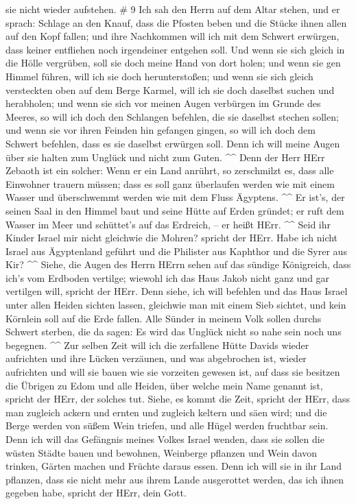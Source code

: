sie nicht wieder aufstehen. \# 9  Ich sah den Herrn auf dem
Altar stehen, und er sprach: Schlage an den Knauf, dass die Pfosten
beben und die Stücke ihnen allen auf den Kopf fallen; und ihre
Nachkommen will ich mit dem Schwert erwürgen, dass keiner entfliehen
noch irgendeiner entgehen soll.  Und wenn sie sich gleich in
die Hölle vergrüben, soll sie doch meine Hand von dort holen; und wenn
sie gen Himmel führen, will ich sie doch herunterstoßen; 
und wenn sie sich gleich versteckten oben auf dem Berge Karmel, will ich
sie doch daselbst suchen und herabholen; und wenn sie sich vor meinen
Augen verbürgen im Grunde des Meeres, so will ich doch den Schlangen
befehlen, die sie daselbst stechen sollen;  und wenn sie vor
ihren Feinden hin gefangen gingen, so will ich doch dem Schwert
befehlen, dass es sie daselbst erwürgen soll. Denn ich will meine Augen
über sie halten zum Unglück und nicht zum Guten. \^{}\^{} 
Denn der Herr HErr Zebaoth ist ein solcher: Wenn er ein Land anrührt, so
zerschmilzt es, dass alle Einwohner trauern müssen; dass es soll ganz
überlaufen werden wie mit einem Wasser und überschwemmt werden wie mit
dem Fluss Ägyptens. \^{}\^{}  Er ist's, der seinen Saal in
den Himmel baut und seine Hütte auf Erden gründet; er ruft dem Wasser im
Meer und schüttet's auf das Erdreich, -- er heißt HErr. \^{}\^{}
 Seid ihr Kinder Israel mir nicht gleichwie die Mohren?
spricht der HErr. Habe ich nicht Israel aus Ägyptenland geführt und die
Philister aus Kaphthor und die Syrer aus Kir? \^{}\^{} 
Siehe, die Augen des Herrn HErrn sehen auf das sündige Königreich, dass
ich's vom Erdboden vertilge; wiewohl ich das Haus Jakob nicht ganz und
gar vertilgen will, spricht der HErr.  Denn siehe, ich will
befehlen und das Haus Israel unter allen Heiden sichten lassen,
gleichwie man mit einem Sieb sichtet, und kein Körnlein soll auf die
Erde fallen.  Alle Sünder in meinem Volk sollen durchs
Schwert sterben, die da sagen: Es wird das Unglück nicht so nahe sein
noch uns begegnen. \^{}\^{}  Zur selben Zeit will ich die
zerfallene Hütte Davids wieder aufrichten und ihre Lücken verzäunen, und
was abgebrochen ist, wieder aufrichten und will sie bauen wie sie
vorzeiten gewesen ist,  auf dass sie besitzen die Übrigen
zu Edom und alle Heiden, über welche mein Name genannt ist, spricht der
HErr, der solches tut.  Siehe, es kommt die Zeit, spricht
der HErr, dass man zugleich ackern und ernten und zugleich keltern und
säen wird; und die Berge werden von süßem Wein triefen, und alle Hügel
werden fruchtbar sein.  Denn ich will das Gefängnis meines
Volkes Israel wenden, dass sie sollen die wüsten Städte bauen und
bewohnen, Weinberge pflanzen und Wein davon trinken, Gärten machen und
Früchte daraus essen.  Denn ich will sie in ihr Land
pflanzen, dass sie nicht mehr aus ihrem Lande ausgerottet werden, das
ich ihnen gegeben habe, spricht der HErr, dein Gott.
